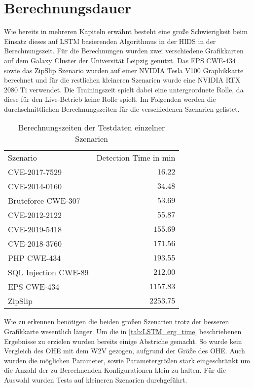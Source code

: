 \section{Berechnungsdauer}\label{sec:erg_time}
    Wie bereits in mehreren Kapiteln erwähnt besteht eine große Schwierigkeit beim Einsatz dieses auf \ac{LSTM} basierenden Algorithmus in der \ac{HIDS} in der Berechnungszeit.
    Für die Berechnungen wurden zwei verschiedene Grafikkarten auf dem Galaxy Cluster der Universität Leipzig genutzt.
    Das EPS CWE-$434$ sowie das ZipSlip Szenario wurden auf einer NVIDIA Tesla V100 Graphikkarte berechnet und für die restlichen kleineren Szenarien wurde eine NVIDIA RTX 2080 Ti verwendet.
    Die Trainingszeit spielt dabei eine untergeordnete Rolle, da diese für den Live-Betrieb keine Rolle spielt.
    Im Folgenden werden die durchschnittlichen Berechnungszeiten für die verschiedenen Szenarien gelistet.
    \begin{table}[ht]
        \centering
        \begin{tabular}{lr}
            \hline
            \rowcolor{GruvGray!36}
            \multicolumn{2}{c}{Berechnungszeiten der verschiedenen Szenarien}\\
            \toprule
            Szenario & Detection Time in min\\
            \midrule
            \rowcolor{GruvGray!16}
            CVE-2017-7529 & $16.22$ \\
            CVE-2014-0160 & $34.48$ \\
            \rowcolor{GruvGray!16}
            Bruteforce CWE-307 & $53.69$ \\
            CVE-2012-2122 & $55.87$ \\
            \rowcolor{GruvGray!16}
            CVE-2019-5418 & $155.69$ \\
            CVE-2018-3760 & $171.56$ \\
            \rowcolor{GruvGray!16}
            PHP CWE-434 & $193.55$ \\
            SQL Injection CWE-89 & $212.00$ \\
            \rowcolor{GruvGray!16}
            EPS CWE-434 & $1157.83$ \\	
            ZipSlip & $2253.75$ \\	
            \hline
        \end{tabular}
        \caption{Berechnungszeiten der Testdaten einzelner Szenarien}
        \label{tab:LSTM_erg_time}
    \end{table}
    Wie zu erkennen benötigen die beiden großen Szenarien trotz der besseren Grafikkarte wesentlich länger.
    Um die in \autoref{tab:LSTM_erg_time} beschriebenen Ergebnisse zu erzielen wurden bereits einige Abstriche gemacht.
    So wurde kein Vergleich des \ac{OHE} mit dem \ac{W2V} gezogen, aufgrund der Größe des \ac{OHE}.
    Auch wurden die möglichen Parameter, sowie Parametergrößen stark eingeschränkt um die Anzahl der zu Berechnenden Konfigurationen klein zu halten.
    Für die Auswahl wurden Tests auf kleineren Szenarien durchgeführt.
    
